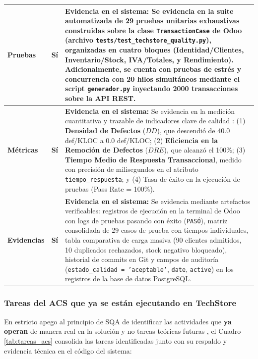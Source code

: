 \documentclass{article}
\begin{document}
\begin{table}[H]
\begin{tabularx}{\textwidth}{p{2.6cm}cp{10.2cm}}
\midrule
\textbf{Pruebas} & \textbf{Sí} & 
\textbf{Evidencia en el sistema:} Se evidencia en la suite automatizada de \textbf{29 pruebas unitarias exhaustivas} construidas sobre la clase \texttt{TransactionCase} de Odoo (archivo \texttt{tests/test\_techstore\_quality.py}), organizadas en cuatro bloques (Identidad/Clientes, Inventario/Stock, IVA/Totales, y Rendimiento). Adicionalmente, se cuenta con pruebas de estrés y concurrencia con 20 hilos simultáneos mediante el script \texttt{generador.py} inyectando 2000 transacciones sobre la API REST. \\
\midrule
\textbf{Métricas} & \textbf{Sí} & 
\textbf{Evidencia en el sistema:} Se evidencia en la medición cuantitativa y trazable de indicadores clave de calidad \cite{kan2002}: (1) \textbf{Densidad de Defectos} ($DD$), que descendió de 40.0 def/KLOC a 0.0 def/KLOC; (2) \textbf{Eficiencia en la Remoción de Defectos} ($DRE$), que alcanzó el 100\%; (3) \textbf{Tiempo Medio de Respuesta Transaccional}, medido con precisión de milisegundos en el atributo \texttt{tiempo\_respuesta}; y (4) Tasa de éxito en la ejecución de pruebas (Pass Rate = 100\%). \\
\midrule
\textbf{Evidencias} & \textbf{Sí} & 
\textbf{Evidencia en el sistema:} Se evidencia mediante artefactos verificables: registros de ejecución en la terminal de Odoo con logs de pruebas pasando con éxito (\texttt{PASÓ}), matriz consolidada de 29 casos de prueba con tiempos individuales, tabla comparativa de carga masiva (90 clientes admitidos, 10 duplicados rechazados, stock negativo bloqueado), historial de commits en Git y campos de auditoría (\texttt{estado\_calidad = 'aceptable'}, \texttt{date}, \texttt{active}) en los registros de la base de datos PostgreSQL. \\
\bottomrule
\end{tabularx}
\end{table}

\subsubsection{Tareas del ACS que ya se están ejecutando en TechStore}
En estricto apego al principio de SQA de identificar las actividades que \textbf{ya operan} de manera real en la solución y no tareas teóricas futuras \cite{pressman2014}, el Cuadro \ref{tab:tareas_acs} consolida las tareas identificadas junto con su respaldo y evidencia técnica en el código del sistema:
\end{document}

